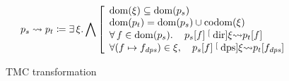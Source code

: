 \begin{figure}[tp]
    \[
        \datalangProg_s \tmc \datalangProg_t
        \coloneqq
        \exists \datalangRenaming \ldotp
        \bigwedge \left[ \begin{array}{l}
                \dom{\datalangRenaming} \subseteq \dom{\datalangProg_s}
            \\
                \dom{\datalangProg_t} = \dom{\datalangProg_s} \cup \codom{\datalangRenaming}
            \\
                \forall \datalangFn \in \dom{\datalangProg_s} \ldotp \quad
                \datalangProg_s[\datalangFn] \tmcDir{\datalangRenaming} \datalangProg_t[\datalangFn]
            \\
                \forall (\datalangFn \mapsto \datalangFn_\mathit{dps}) \in \datalangRenaming, \quad
                \datalangProg_s[\datalangFn] \tmcDps{\datalangRenaming} \datalangProg_t[\datalangFn_\mathit{dps}]
        \end{array} \right.
    \]
    \caption{TMC transformation}
    \label{fig:tmc}
\end{figure}